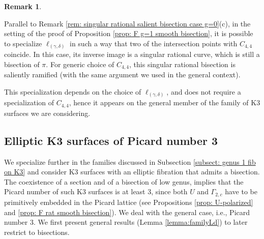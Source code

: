 \documentclass{amsart}
\theoremstyle{definition}
\newtheorem{remark}[theorem]{Remark}
\numberwithin{equation}{section}
\begin{document}
\begin{remark}\label{rem: singular rational salient bisection case g=1}{\rm Parallel to Remark \ref{rem: singular rational salient bisection case g=0}(c), in the setting of the proof of Proposition \ref{prop: F g=1 smooth bisection}, it is possible to specialize $\ell_{(\gamma,\delta)}$ in such a way that two of the intersection points with $C_{4,4}$ coincide. In this case, its inverse image is a singular rational curve, which is still a bisection of $\pi$. For generic choice of $C_{4,4}$, this singular rational bisection is saliently ramified (with the same argument we used in the general context).

This specialization depends on the choice of $\ell_{(\gamma,\delta)}$, and does not require a specialization of $C_{4,4}$, hence  it appears on the general member of the family of K3 surfaces we are considering.}
\end{remark}


\subsection{Elliptic K3 surfaces of Picard number 3}\label{subsec:Picard3}

We specialize further in the families discussed in Subsection \ref{subsect: genus 1 fib on K3} and consider K3 surfaces with an elliptic fibration that admits a bisection. The coexistence of a section and of a bisection of low genus, implies that the Picard number of such K3 surfaces is at least 3, since both $U$ and $\Gamma_{2,c}$ have to be primitively embedded in the Picard lattice (see Propositions \ref{prop: U-polarized} and \ref{prop: F rat smooth bisection}). We deal with the general case, i.e., Picard number 3. We first present general results (Lemma \ref{lemma:familyLd}) to later restrict to bisections.
\end{document}
